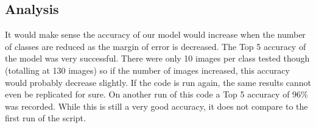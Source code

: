 \tocless\subsection{Analysis}
It would make sense the accuracy of our model would increase when the number of classes are reduced as the margin of error is decreased.
The Top 5 accuracy of the model was very successful.
There were only 10 images per class tested though (totalling at 130 images) so if the number of images increased, this accuracy would probably decrease slightly.
If the code is run again, the same results cannot even be replicated for sure.
On another run of this code a Top 5 accuracy of 96\% was recorded.
While this is still a very good accuracy, it does not compare to the first run of the script.